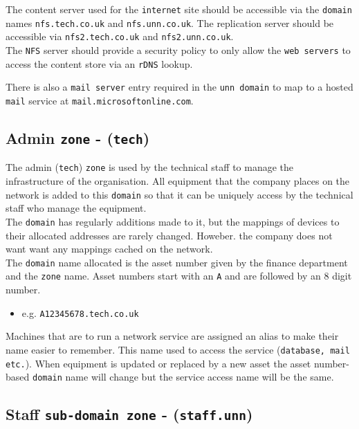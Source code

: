 \documentclass[11pt]{article}
\begin{document}
\noindent The content server used for the \texttt{internet} site should be accessible via the \texttt{domain} names \texttt{nfs.tech.co.uk} and 
\texttt{nfs.unn.co.uk}. The replication server should be accessible via \texttt{nfs2.tech.co.uk} and \texttt{nfs2.unn.co.uk}.\\

\noindent The \texttt{NFS} server should provide a security policy to only allow the \texttt{web servers} to access the content store via an \texttt{rDNS} lookup.

\noindent There is also a \texttt{mail server} entry required in the \texttt{unn domain} to map to a hosted \texttt{mail} service at \texttt{mail.microsoftonline.com}. 

\subsection{Admin \texttt{zone} - (\texttt{tech})}

\noindent The admin (\texttt{tech}) \texttt{zone} is used by the technical staff to manage the infrastructure of the organisation. All equipment that the company places 
on the network is added to this \texttt{domain} so that it can be uniquely access by the technical staff who manage the equipment.\\

The \texttt{domain} has regularly additions made to it, but the mappings of devices to their allocated addresses are rarely changed. Howeber. the company does not want 
want any mappings cached on the network.\\

The \texttt{domain} name allocated is the asset number given by the finance department and the \texttt{zone} name. Asset numbers start with an \texttt{A} and 
are followed by an 8 digit number.
\begin{itemize}
    \item e.g. \texttt{A12345678.tech.co.uk}
\end{itemize}

\noindent Machines that are to run a network service are assigned an alias to make their name easier to remember. This name used to access the service 
(\texttt{database, mail etc.}). When equipment is updated or replaced by a new asset the asset number-based \texttt{domain} name will change but the 
service access name will be the same.

\subsection{Staff \texttt{sub-domain zone} - (\texttt{staff.unn})}
\end{document}

